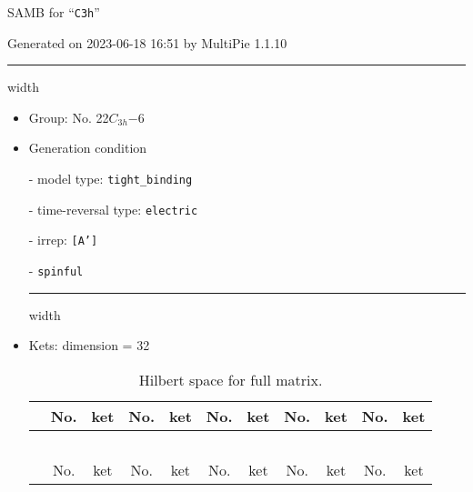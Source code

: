 \documentclass[fleqn,10pt,landscape]{article}
\begin{document}
\setcounter{MaxMatrixCols}{16}

\setlength{\baselineskip}{16pt}
\footnotesize
\begin{center}
\LARGE
SAMB for ``\texttt{C3h}''
\end{center}
\begin{flushright}
Generated on 2023-06-18 16:51 by MultiPie 1.1.10
\end{flushright}
\vspace{1cm}


 \hfil \hrule height 1mm width \textwidth \hfil

\begin{itemize}
\item Group: No. 22\quad$C_{3h}$\quad$-6$\quad[ hexagonal ]

\vspace{5mm}

\item Generation condition

\quad - model type: \texttt{tight_binding}

\quad - time-reversal type: \texttt{electric}

\quad - irrep: \texttt{[A']}

\quad - \texttt{spinful}


 \hfil \hrule height 1mm width \textwidth \hfil

\item Kets: dimension = 32
\begin{center}
\renewcommand{\arraystretch}{1.3}
\begin{longtable}{c|cc|cc|cc|cc|cc}
\caption{Hilbert space for full matrix.}
 \\
 \hline \hline
 & No. & ket & No. & ket & No. & ket & No. & ket & No. & ket \\ \hline \endfirsthead

\multicolumn{10}{l}{\tablename\ \thetable{}} \\
 \hline \hline
 & No. & ket & No. & ket & No. & ket & No. & ket & No. & ket \\ \hline \endhead


\end{longtable}
\end{center}
\end{itemize}
\end{document}
